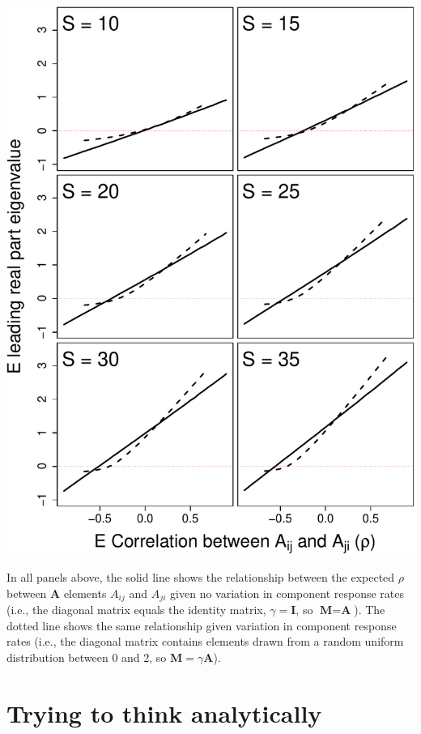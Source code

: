 \documentclass[]{article}
\begin{document}
\includegraphics{revision_notes_files/figure-latex/unnamed-chunk-10-1.pdf}

In all panels above, the solid line shows the relationship between the
expected \(\rho\) between \(\textbf{A}\) elements \(A_{ij}\) and
\(A_{ji}\) given no variation in component response rates (i.e., the
diagonal matrix equals the identity matrix, \(\gamma = \textbf{I}\), so
\(\textbf{M} = \textbf{A}\)). The dotted line shows the same
relationship given variation in component response rates (i.e., the
diagonal matrix contains elements drawn from a random uniform
distribution between 0 and 2, so \(\textbf{M} = \gamma\textbf{A}\)).

\hypertarget{trying-to-think-analytically}{%
\section{Trying to think
analytically}\label{trying-to-think-analytically}}
\end{document}
